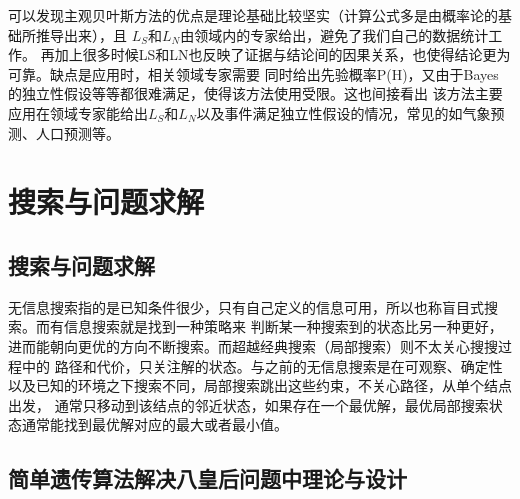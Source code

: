 \documentclass[12pt,a4paper,UTF8]{ctexart}
\begin{document}
可以发现主观贝叶斯方法的优点是理论基础比较坚实（计算公式多是由概率论的基础所推导出来），且
$ L_S $和$ L_N $由领域内的专家给出，避免了我们自己的数据统计工作。
再加上很多时候LS和LN也反映了证据与结论间的因果关系，也使得结论更为可靠。缺点是应用时，相关领域专家需要
同时给出先验概率P(H)，又由于Bayes的独立性假设等等都很难满足，使得该方法使用受限。这也间接看出
该方法主要应用在领域专家能给出$ L_S $和$ L_N $以及事件满足独立性假设的情况，常见的如气象预测、人口预测等。

\section{搜索与问题求解}
\subsection{搜索与问题求解}
无信息搜索指的是已知条件很少，只有自己定义的信息可用，所以也称盲目式搜索。而有信息搜索就是找到一种策略来
判断某一种搜索到的状态比另一种更好，进而能朝向更优的方向不断搜索。而超越经典搜索（局部搜索）则不太关心搜搜过程中的
路径和代价，只关注解的状态。与之前的无信息搜索是在可观察、确定性以及已知的环境之下搜索不同，局部搜索跳出这些约束，不关心路径，从单个结点出发，
通常只移动到该结点的邻近状态，如果存在一个最优解，最优局部搜索状态通常能找到最优解对应的最大或者最小值。
\subsection{简单遗传算法解决八皇后问题中理论与设计}
\end{document}
